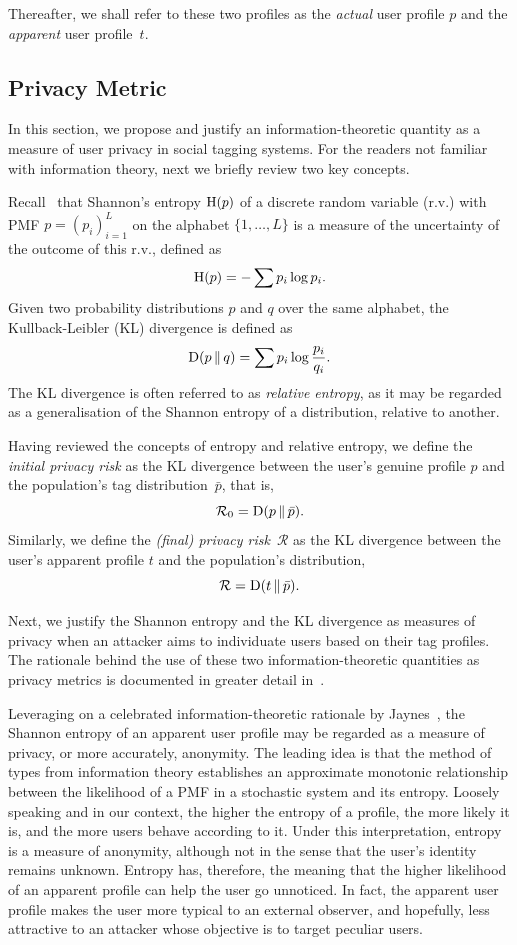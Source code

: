 Thereafter, we shall refer to these two profiles as the \emph{actual} user profile $p$ and the \emph{apparent} user profile~$t$.

\subsection{Privacy Metric}
\label{sec:priv-metric}
In this section, we propose and justify an information-theoretic quantity as a measure of user privacy in social tagging systems.
For the readers not familiar with information theory, next we briefly review two key concepts.

Recall~\cite{Cover06B} that Shannon's entropy $\operatorname{H}(p)$ of a discrete random variable (r.v.) with PMF $p=(p_i)_{i=1}^L$ on the alphabet $\{1,\ldots,L\}$ is a measure of the uncertainty of the outcome of this r.v., defined as
\begin{equation*}
\operatorname{H}(p)=-\sum p_i   \log p_i.
\end{equation*}
Given two probability distributions $p$ and $q$ over the same alphabet, the Kullback-Leibler (KL) divergence is defined as
\begin{equation*}
\operatorname{D}(p\,\|\,q)=\sum p_i   \log \frac{p_i}{q_i}.
\end{equation*}
The KL divergence is often referred to as \emph{relative entropy}, as it may be regarded as a generalisation of the Shannon entropy of a distribution, relative to another.

Having reviewed the concepts of entropy and relative entropy, we define the \emph{initial privacy risk} as the KL divergence between the user's genuine profile $p$ and the population's tag distribution~$\bar{p}$, that is, $$\mathcal{R}_0 = \operatorname{D}(p\,\|\,\bar{p}).$$
Similarly, we define the \emph{(final) privacy risk}~$\mathcal{R}$ as the KL divergence between the user's apparent profile $t$ and the population's distribution, $$\mathcal{R}=\operatorname{D}(t\,\|\,\bar{p}).$$

Next, we justify the Shannon entropy and the KL divergence as measures of privacy when an attacker aims to individuate users based on their tag profiles.
The rationale behind the use of these two information-theoretic quantities as privacy metrics is documented in greater detail in~\cite{parra2014measuring}.

Leveraging on a celebrated information-theoretic rationale by Jaynes~\cite{Jaynes82P}, the Shannon entropy of an apparent user profile may be regarded as a measure of privacy, or more accurately, anonymity.
The leading idea is that the method of types from information theory establishes an approximate monotonic relationship between the likelihood of a PMF in a stochastic system and its entropy. Loosely speaking and in our context, the higher the entropy of a profile, the more likely it is, and the more users behave according to it. Under this interpretation, entropy is a measure of anonymity, although not in the sense that the user's identity remains unknown. Entropy has, therefore, the meaning that the higher likelihood of an apparent profile can help the user go unnoticed. In fact, the apparent user profile makes the user more typical to an external observer, and hopefully, less attractive to an attacker whose objective is to target peculiar users.

